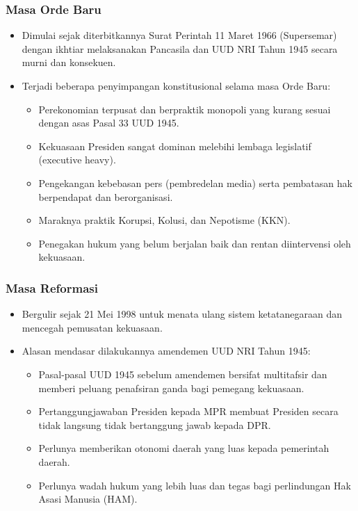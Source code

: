 \subsubsection{Masa Orde Baru}
\begin{itemize}
\item Dimulai sejak diterbitkannya Surat Perintah 11 Maret 1966 (Supersemar) dengan ikhtiar melaksanakan Pancasila dan UUD NRI Tahun 1945 secara murni dan konsekuen.
\item Terjadi beberapa penyimpangan konstitusional selama masa Orde Baru:
  \begin{itemize}
  \item Perekonomian terpusat dan berpraktik monopoli yang kurang sesuai dengan asas Pasal 33 UUD 1945.
  \item Kekuasaan Presiden sangat dominan melebihi lembaga legislatif (executive heavy).
  \item Pengekangan kebebasan pers (pembredelan media) serta pembatasan hak berpendapat dan berorganisasi.
  \item Maraknya praktik Korupsi, Kolusi, dan Nepotisme (KKN).
  \item Penegakan hukum yang belum berjalan baik dan rentan diintervensi oleh kekuasaan.
  \end{itemize}
\end{itemize}

\subsubsection{Masa Reformasi}
\begin{itemize}
\item Bergulir sejak 21 Mei 1998 untuk menata ulang sistem ketatanegaraan dan mencegah pemusatan kekuasaan.
\item Alasan mendasar dilakukannya amendemen UUD NRI Tahun 1945:
  \begin{itemize}
  \item Pasal-pasal UUD 1945 sebelum amendemen bersifat multitafsir dan memberi peluang penafsiran ganda bagi pemegang kekuasaan.
  \item Pertanggungjawaban Presiden kepada MPR membuat Presiden secara tidak langsung tidak bertanggung jawab kepada DPR.
  \item Perlunya memberikan otonomi daerah yang luas kepada pemerintah daerah.
  \item Perlunya wadah hukum yang lebih luas dan tegas bagi perlindungan Hak Asasi Manusia (HAM).
  \end{itemize}
\end{itemize}

